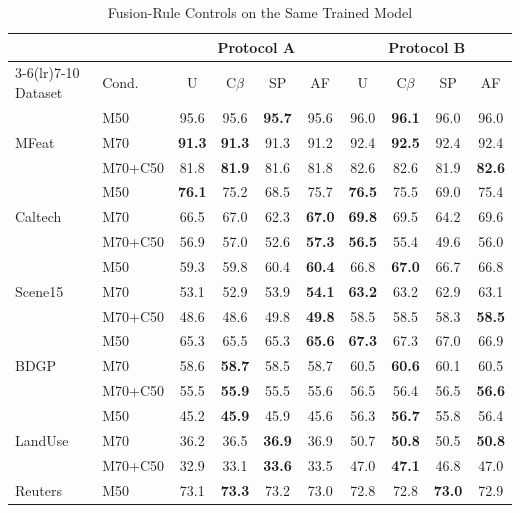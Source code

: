 \begin{table}[!t]
\caption{Fusion-Rule Controls on the Same Trained Model}
\label{tab:controls}
\centering
\footnotesize
\setlength{\tabcolsep}{2.2pt}
\begin{tabular}{llcccccccc}
\toprule
& & \multicolumn{4}{c}{Protocol A} & \multicolumn{4}{c}{Protocol B} \\
\cmidrule(lr){3-6}\cmidrule(lr){7-10}
Dataset & Cond. & U & C$\beta$ & SP & AF & U & C$\beta$ & SP & AF \\
\midrule
\multirow{3}{*}{MFeat} & M50 & 95.6 & 95.6 & \textbf{95.7} & 95.6 & 96.0 & \textbf{96.1} & 96.0 & 96.0 \\
 & M70 & \textbf{91.3} & \textbf{91.3} & 91.3 & 91.2 & 92.4 & \textbf{92.5} & 92.4 & 92.4 \\
 & M70+C50 & 81.8 & \textbf{81.9} & 81.6 & 81.8 & 82.6 & 82.6 & 81.9 & \textbf{82.6} \\
\midrule
\multirow{3}{*}{Caltech} & M50 & \textbf{76.1} & 75.2 & 68.5 & 75.7 & \textbf{76.5} & 75.5 & 69.0 & 75.4 \\
 & M70 & 66.5 & 67.0 & 62.3 & \textbf{67.0} & \textbf{69.8} & 69.5 & 64.2 & 69.6 \\
 & M70+C50 & 56.9 & 57.0 & 52.6 & \textbf{57.3} & \textbf{56.5} & 55.4 & 49.6 & 56.0 \\
\midrule
\multirow{3}{*}{Scene15} & M50 & 59.3 & 59.8 & 60.4 & \textbf{60.4} & 66.8 & \textbf{67.0} & 66.7 & 66.8 \\
 & M70 & 53.1 & 52.9 & 53.9 & \textbf{54.1} & \textbf{63.2} & 63.2 & 62.9 & 63.1 \\
 & M70+C50 & 48.6 & 48.6 & 49.8 & \textbf{49.8} & 58.5 & 58.5 & 58.3 & \textbf{58.5} \\
\midrule
\multirow{3}{*}{BDGP} & M50 & 65.3 & 65.5 & 65.3 & \textbf{65.6} & \textbf{67.3} & 67.3 & 67.0 & 66.9 \\
 & M70 & 58.6 & \textbf{58.7} & 58.5 & 58.7 & 60.5 & \textbf{60.6} & 60.1 & 60.5 \\
 & M70+C50 & 55.5 & \textbf{55.9} & 55.5 & 55.6 & 56.5 & 56.4 & 56.5 & \textbf{56.6} \\
\midrule
\multirow{3}{*}{LandUse} & M50 & 45.2 & \textbf{45.9} & 45.9 & 45.6 & 56.3 & \textbf{56.7} & 55.8 & 56.4 \\
 & M70 & 36.2 & 36.5 & \textbf{36.9} & 36.9 & 50.7 & \textbf{50.8} & 50.5 & \textbf{50.8} \\
 & M70+C50 & 32.9 & 33.1 & \textbf{33.6} & 33.5 & 47.0 & \textbf{47.1} & 46.8 & 47.0 \\
\midrule
\multirow{3}{*}{Reuters} & M50 & 73.1 & \textbf{73.3} & 73.2 & 73.0 & 72.8 & 72.8 & \textbf{73.0} & 72.9 \\

\end{tabular}
\end{table}
